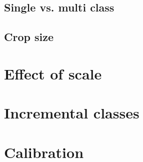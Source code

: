 \subsection {Single vs. multi class}
\label{sec:multi_class}



\subsection {Crop size}
\label{sec:crop_size}



\section {Effect of scale}
\label{sec:detection_architecture}



\section {Incremental classes}
\label{sec:incremental}


\section {Calibration}
\label{sec:calibration}
